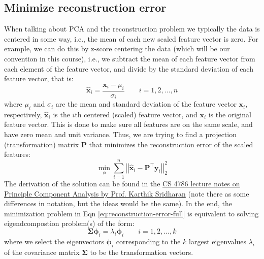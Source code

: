 \documentclass{article}[11pt]
\newcommand{\norm}[1]{\left|\left|#1\right|\right|}
\begin{document}
\subsection*{Minimize reconstruction error}
When talking about PCA and the reconstruction problem we typically the data is centered in some way, i.e., the mean of each new scaled feature vector is zero.
For example, we can do this by z-score centering the data (which will be our convention in this course), i.e., we subtract the mean of each feature vector from each element of the feature vector, and divide by the standard deviation of each feature vector, 
that is:
\begin{equation}
   \hat{\mathbf{x}}_{i} = \frac{\mathbf{x}_{i}-\mu_{i}}{\sigma_{i}}\qquad{i=1,2,\dots,n}
\end{equation}
where $\mu_{i}$ and $\sigma_{i}$ are the mean and standard deviation of the feature vector $\mathbf{x}_{i}$, respectively, $\hat{\mathbf{x}}_{i}$ is the $i$th centered (scaled) feature vector, 
and $\mathbf{x}_{i}$ is the original feature vector. This is done to make sure all features are on the same scale, and have zero mean and unit variance.
Thus, we are trying to find a projection (transformation) matrix $\mathbf{P}$ that minimizes the reconstruction error of the scaled features:
\begin{equation}\label{eq:reconstruction-error-full}
   \min_{\phi}\sum_{i=1}^{n}\norm{\hat{\mathbf{x}}_{i}-\mathbf{P}^{\top}\mathbf{y}_{i}}_{2}^{2}
\end{equation}
The derivation of the solution can be found in the \href{https://cornell.box.com/s/uuv2xeoil6pejul3hrdg6hqe96pxruui}{CS 4786 lecture notes on Principle Component Analysis by Prof. Karthik Sridharan} (note there as some differences in notation, but the ideas would be the same).  
In the end, the minimization problem in Eqn \eqref{eq:reconstruction-error-full} is equivalent to solving eigendcompostion problem(s) of the form:
\begin{equation}
\mathbf{\Sigma}\mathbf{\phi}_{i} = \lambda_{i}\mathbf{\phi}_{i}\qquad{i=1,2,\dots,k}
\end{equation}
where we select the eigenvectors $\mathbf{\phi}_{i}$ corresponding to the $k$ largest eigenvalues $\lambda_{i}$ of the covariance matrix $\mathbf{\Sigma}$ to be the transformation vectors.
\end{document}
